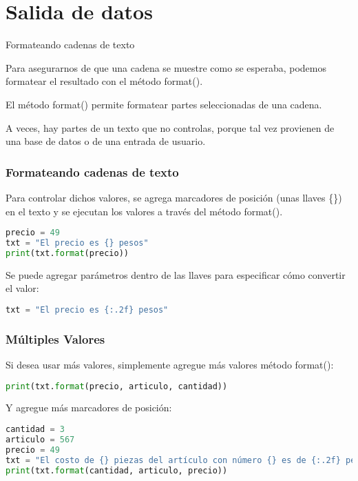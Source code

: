 \section{Salida de datos}

\begin{frame}[c]{Formateando cadenas de texto}

  Para asegurarnos de que una cadena se muestre como se esperaba,
  podemos formatear el resultado con el método
  \textcolor{codeKeyword2}{format}().

  \vspace{\baselineskip}
  El método \textcolor{codeKeyword2}{format}() permite formatear
  partes seleccionadas de una cadena.

  \vspace{\baselineskip}
  A veces, hay partes de un texto que no controlas, porque tal vez provienen
  de una base de datos o de una entrada de usuario.

\end{frame}

\begin{frame}[fragile]
  \frametitle{Formateando cadenas de texto}

  Para controlar dichos valores, se agrega marcadores de posición
  (unas llaves \{\}) en el texto y se ejecutan los valores a través del
  método \textcolor{codeKeyword2}{format}().

  \vspace{\baselineskip}
  \begin{lstlisting}[language=Python]
precio = 49
txt = "El precio es {} pesos"
print(txt.format(precio))
  \end{lstlisting}

  \pausa
  Se puede agregar parámetros dentro de las llaves para especificar cómo convertir el valor:

  \vspace{\baselineskip}
  \begin{lstlisting}[language=Python]
txt = "El precio es {:.2f} pesos"
  \end{lstlisting}
\end{frame}

\begin{frame}[fragile]
  \frametitle{Múltiples Valores}

  Si desea usar más valores, simplemente agregue más valores
  método \textcolor{codeKeyword2}{format}():

  \vspace{\baselineskip}
  \begin{lstlisting}[language=Python]
print(txt.format(precio, articulo, cantidad))
  \end{lstlisting}

  \pausa
  Y agregue más marcadores de posición: 

  \vspace{\baselineskip}
  \begin{lstlisting}[language=Python]
cantidad = 3
articulo = 567
precio = 49
txt = "El costo de {} piezas del artículo con número {} es de {:.2f} pesos"
print(txt.format(cantidad, articulo, precio))
  \end{lstlisting}
\end{frame}

